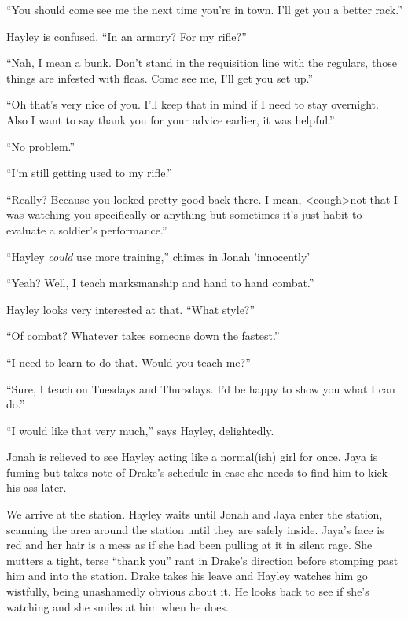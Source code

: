 ``You should come see me the next time you're in town.  I'll get you a better rack.''

Hayley is confused.  ``In an armory?  For my rifle?''

``Nah, I mean a bunk.  Don't stand in the requisition line with the regulars, those things are infested with fleas.  Come see me, I'll get you set up.''

``Oh that's very nice of you.  I'll keep that in mind if I need to stay overnight.  Also I want to say thank you for your advice earlier, it was helpful.''

``No problem.''

``I'm still getting used to my rifle.''

``Really?  Because you looked pretty good back there.  I mean, \textless cough\textgreater  not that I was watching you specifically or anything but sometimes it's just habit to evaluate a soldier's performance.''

``Hayley \textit{could }use more training,'' chimes in Jonah 'innocently'

``Yeah?  Well, I teach marksmanship and hand to hand combat.''

Hayley looks very interested at that.  ``What style?''

``Of combat?  Whatever takes someone down the fastest.''

``I need to learn to do that. Would you teach me?''

``Sure, I teach on Tuesdays and Thursdays. I'd be happy to show you what I can do.''

``I would like that very much,'' says Hayley, delightedly.

Jonah is relieved to see Hayley acting like a normal(ish) girl for once.  Jaya is fuming but takes note of Drake's schedule in case she needs to find him to kick his ass later.





We arrive at the station.  Hayley waits until Jonah and Jaya enter the station, scanning the area around the station until they are safely inside.  Jaya's face is red and her hair is a mess as if she had been pulling at it in silent rage.  She mutters a tight, terse ``thank you'' rant in Drake's direction before stomping past him and into the station. Drake takes his leave and Hayley watches him go wistfully, being unashamedly obvious about it.  He looks back to see if she's watching and she smiles at him when he does.  



